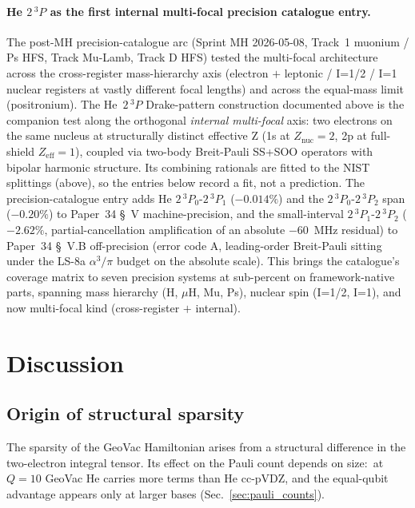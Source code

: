\documentclass[aps,pra,twocolumn,superscriptaddress,longbibliography]{revtex4-2}
\begin{document}
\paragraph{He $2\,^3\!P$ as the first internal multi-focal precision
catalogue entry.}
The post-MH precision-catalogue arc (Sprint MH 2026-05-08, Track~1
muonium / Ps HFS, Track Mu-Lamb, Track D HFS) tested the multi-focal
architecture across the cross-register mass-hierarchy axis (electron
$+$ leptonic / I=1/2 / I=1 nuclear registers at vastly different
focal lengths) and across the equal-mass limit (positronium).  The
He~$2\,^3\!P$ Drake-pattern construction documented above is the
companion test along the orthogonal \emph{internal multi-focal} axis:
two electrons on the same nucleus at structurally distinct effective Z
(1s at $Z_\text{nuc}=2$, 2p at full-shield $Z_\text{eff}=1$), coupled
via two-body Breit-Pauli SS+SOO operators with bipolar harmonic
structure.  Its combining rationals are fitted to the NIST splittings
(above), so the entries below record a fit, not a prediction.  The
precision-catalogue entry adds He
$2\,^3\!P_0$-$2\,^3\!P_1$ ($-0.014\%$) and the $2\,^3\!P_0$-$2\,^3\!P_2$
span ($-0.20\%$) to Paper~34 \S~V machine-precision, and the
small-interval $2\,^3\!P_1$-$2\,^3\!P_2$ ($-2.62\%$, partial-cancellation
amplification of an absolute $-60$~MHz residual) to Paper~34 \S~V.B
off-precision (error code A, leading-order Breit-Pauli sitting under
the LS-8a $\alpha^3/\pi$ budget on the absolute scale).  This brings
the catalogue's coverage matrix to seven precision systems at sub-percent
on framework-native parts, spanning mass hierarchy (H, $\mu$H, Mu, Ps),
nuclear spin (I=1/2, I=1), and now multi-focal kind (cross-register
$+$ internal).

\section{Discussion}
\label{sec:discussion}

\subsection{Origin of structural sparsity}
\label{sec:origin}

The sparsity of the GeoVac Hamiltonian arises from a structural
difference in the two-electron integral tensor.  Its effect on the Pauli
count depends on size:\ at $Q = 10$ GeoVac He carries more terms than
He cc-pVDZ, and the equal-qubit advantage appears only at larger bases
(Sec.~\ref{sec:pauli_counts}).
\end{document}
